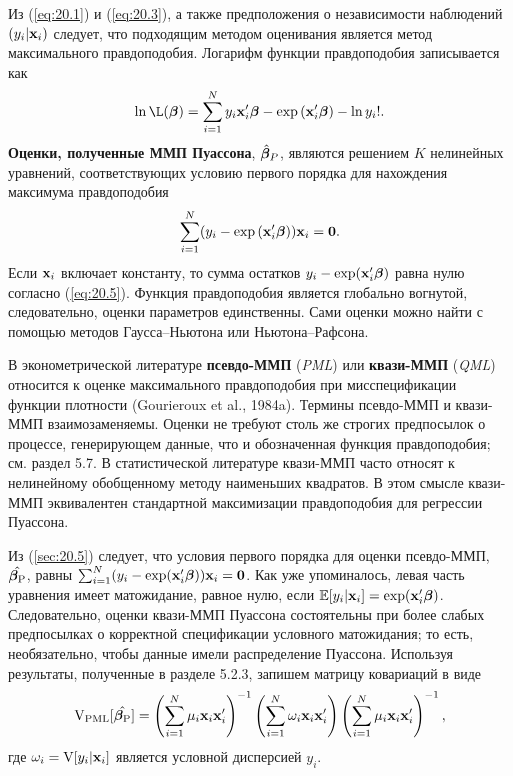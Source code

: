 Из (\ref{eq:20.1}) и (\ref{eq:20.3}), а также предположения о независимости наблюдений $(y_i|\mathbf{x}_i)$ следует, что подходящим методом оценивания является метод максимального правдоподобия. Логарифм функции правдоподобия записывается как
    \begin{align}\label{eq:20.4}
    \ln \L(\be) = \sum^{N}_{i=1} {y_i\xib - \exp{(\xib) - \ln y_i !}}.
    \end{align}
\textbf{Оценки, полученные ММП Пуассона}, $\hat{\bm{\beta}}_P$, являются решением $K$ нелинейных уравнений, соответствующих условию первого порядка для нахождения максимума правдоподобия
    \begin{align}\label{eq:20.5}
    \sum^{N}_{i=1} (y_i - \exp{(\mathbf{x}_i'\bm{\beta})})\mathbf{x}_i = \textbf{0}.
    \end{align}
Если $\mathbf{x}_i$ включает константу, то сумма остатков $y_i - \exp(\mathbf{x}_i'\bm{\beta})$ равна нулю согласно (\ref{eq:20.5}). Функция правдоподобия является глобально вогнутой, следовательно, оценки параметров единственны. Сами оценки можно найти с помощью методов Гаусса--Ньютона или Ньютона--Рафсона.

В эконометрической литературе \textbf{псевдо-ММП} (\textit{PML}) или \textbf{квази-ММП} (\textit{QML}) относится к оценке максимального правдоподобия при мисспецификации функции плотности (Gourieroux et al., 1984a). Термины псевдо-ММП и квази-ММП взаимозаменяемы. Оценки не требуют столь же строгих предпосылок о процессе, генерирующем данные, что и обозначенная функция правдоподобия; см. раздел 5.7. %
В статистической литературе квази-ММП часто относят к нелинейному обобщенному методу наименьших квадратов. В этом смысле квази-ММП эквивалентен стандартной максимизации правдоподобия для регрессии Пуассона.

Из (\ref{sec:20.5}) следует, что условия первого порядка для оценки псевдо-ММП, $\hat{\bm{\beta}_{\mathrm{P}}}$, равны $\sum^{N}_{i = 1} (y_i - \exp(\mathbf{x}_i'\bm{\beta}))\mathbf{x}_i = \mathbf{0}$. Как уже упоминалось, левая часть уравнения имеет матожидание, равное нулю, если $\mathbb{E}[y_i|\mathbf{x}_i] = \exp(\mathbf{x}_i'\bm{\beta})$. Следовательно, оценки квази-ММП Пуассона состоятельны при более слабых предпосылках о корректной спецификации условного матожидания; то есть, необязательно, чтобы данные имели распределение Пуассона. Используя результаты, полученные в разделе 5.2.3, %
запишем матрицу ковариаций в виде
    \begin{align}\label{eq:20.6}
    \mathrm{V}_{\mathrm{PML}}[\hat{\bm{\beta}_{\mathrm{P}}}] = \left( \sum^{N}_{i = 1} \mu_i \mathbf{x}_i\mathbf{x}'_i \right)^{-1} \left( \sum^{N}_{i = 1} \omega_i \mathbf{x}_i\mathbf{x}'_i \right) \left( \sum^{N}_{i = 1} \mu_i \mathbf{x}_i\mathbf{x}'_i \right)^{-1},
    \end{align}
где $\omega_i = \mathrm{V}[y_i|\mathbf{x}_i]$ является условной дисперсией $y_i$.

